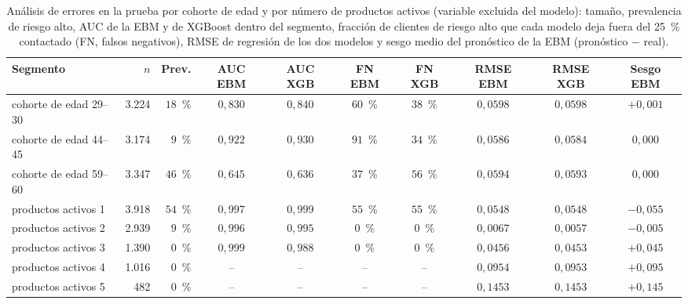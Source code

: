 \begin{table}[tbp]
  \centering\scriptsize\setlength{\tabcolsep}{2pt}
  \caption{Análisis de errores en la prueba por cohorte de edad y por número de productos activos (variable excluida del modelo): tamaño, prevalencia de riesgo alto, AUC de la EBM y de XGBoost dentro del segmento, fracción de clientes de riesgo alto que cada modelo deja fuera del 25~\% contactado (FN, falsos negativos), RMSE de regresión de los dos modelos y sesgo medio del pronóstico de la EBM (pronóstico $-$ real).}
  \label{tab:errores}
  \begin{tabular}{@{}l r r c c c c c c c@{}}
    \toprule
    Segmento & $n$ & Prev. & AUC EBM & AUC XGB & FN EBM & FN XGB & RMSE EBM & RMSE XGB & Sesgo EBM \\
    \midrule
    cohorte de edad 29--30 & 3.224 & $18$~\% & $0{,}830$ & $0{,}840$ & $60$~\% & $38$~\% & $0{,}0598$ & $0{,}0598$ & $+0{,}001$ \\
    cohorte de edad 44--45 & 3.174 & $9$~\% & $0{,}922$ & $0{,}930$ & $91$~\% & $34$~\% & $0{,}0586$ & $0{,}0584$ & $0{,}000$ \\
    cohorte de edad 59--60 & 3.347 & $46$~\% & $0{,}645$ & $0{,}636$ & $37$~\% & $56$~\% & $0{,}0594$ & $0{,}0593$ & $0{,}000$ \\
    \midrule
    productos activos 1 & 3.918 & $54$~\% & $0{,}997$ & $0{,}999$ & $55$~\% & $55$~\% & $0{,}0548$ & $0{,}0548$ & $-0{,}055$ \\
    productos activos 2 & 2.939 & $9$~\% & $0{,}996$ & $0{,}995$ & $0$~\% & $0$~\% & $0{,}0067$ & $0{,}0057$ & $-0{,}005$ \\
    productos activos 3 & 1.390 & $0$~\% & $0{,}999$ & $0{,}988$ & $0$~\% & $0$~\% & $0{,}0456$ & $0{,}0453$ & $+0{,}045$ \\
    productos activos 4 & 1.016 & $0$~\% & -- & -- & -- & -- & $0{,}0954$ & $0{,}0953$ & $+0{,}095$ \\
    productos activos 5 & 482 & $0$~\% & -- & -- & -- & -- & $0{,}1453$ & $0{,}1453$ & $+0{,}145$ \\
    \bottomrule
  \end{tabular}
\end{table}
